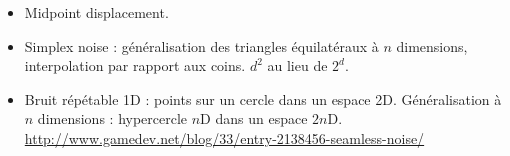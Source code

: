 \documentclass[hyperref={pdfpagelabels=false}]{beamer}
\begin{document}
\begin{frame}
\begin{itemize}
{\begin{figure}[h]
      \end{figure}
    }
  \item<4-> Midpoint displacement.
  \item<5-> Simplex noise : généralisation des triangles équilatéraux à $n$ dimensions, interpolation par rapport aux coins. $d^2$ au lieu de $2^d$.
  \item<6-> Bruit répétable 1D : points sur un cercle dans un espace 2D. Généralisation à $n$ dimensions : hypercercle $n$D dans un espace $2n$D.
    {\tiny\url{http://www.gamedev.net/blog/33/entry-2138456-seamless-noise/}}
  \end{itemize}
\end{frame}
\end{document}
